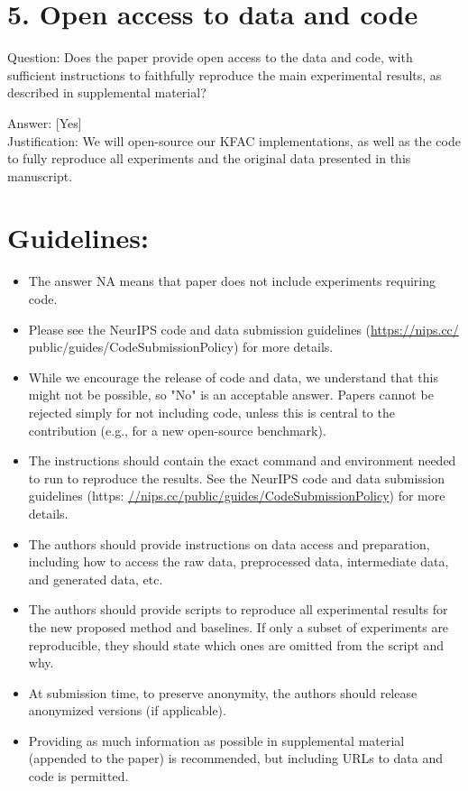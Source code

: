 \documentclass[10pt]{article}
\begin{document}
\section*{5. Open access to data and code}
Question: Does the paper provide open access to the data and code, with sufficient instructions to faithfully reproduce the main experimental results, as described in supplemental material?

Answer: [Yes]\\
Justification: We will open-source our KFAC implementations, as well as the code to fully reproduce all experiments and the original data presented in this manuscript.

\section*{Guidelines:}
\begin{itemize}
  \item The answer NA means that paper does not include experiments requiring code.
  \item Please see the NeurIPS code and data submission guidelines (\href{https://nips.cc/}{https://nips.cc/} public/guides/CodeSubmissionPolicy) for more details.
  \item While we encourage the release of code and data, we understand that this might not be possible, so "No" is an acceptable answer. Papers cannot be rejected simply for not including code, unless this is central to the contribution (e.g., for a new open-source benchmark).
  \item The instructions should contain the exact command and environment needed to run to reproduce the results. See the NeurIPS code and data submission guidelines (https: \href{//nips.cc/public/guides/CodeSubmissionPolicy}{//nips.cc/public/guides/CodeSubmissionPolicy}) for more details.
  \item The authors should provide instructions on data access and preparation, including how to access the raw data, preprocessed data, intermediate data, and generated data, etc.
  \item The authors should provide scripts to reproduce all experimental results for the new proposed method and baselines. If only a subset of experiments are reproducible, they should state which ones are omitted from the script and why.
  \item At submission time, to preserve anonymity, the authors should release anonymized versions (if applicable).
  \item Providing as much information as possible in supplemental material (appended to the paper) is recommended, but including URLs to data and code is permitted.
\end{itemize}
\end{document}
